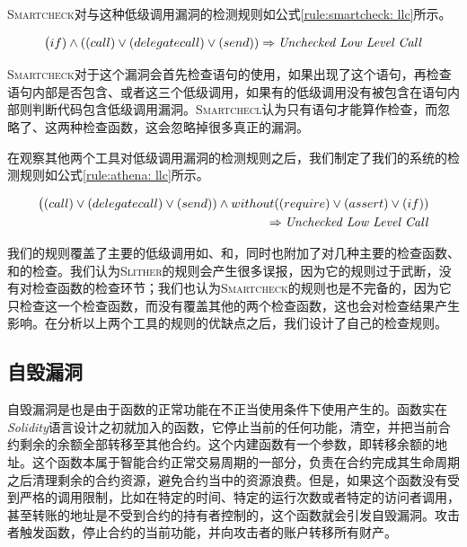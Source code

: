 \textsc{Smartcheck}对与这种低级调用漏洞的检测规则如公式\ref{rule:smartcheck: llc}所示。
\begin{mdframed}[
	linewidth = 1pt,
	innertopmargin = -5pt,
	innerbottommargin = 3pt,
	outerlinewidth = 1pt
	]
    \small
	\begin{equation} \label{rule:smartcheck: llc}
    \big (if) \wedge ((call) \vee (delegatecall) \vee (send)) \Rightarrow \text{\emph{Unchecked Low Level Call}}
	\end{equation}
\end{mdframed}
\textsc{Smartcheck}对于这个漏洞会首先检查语句的使用，如果出现了这个语句，再检查语句内部是否包含、或者这三个低级调用，如果有的低级调用没有被包含在语句内部则判断代码包含低级调用漏洞。\textsc{Smartchecl}认为只有语句才能算作检查，而忽略了、这两种检查函数，这会忽略掉很多真正的漏洞。

在观察其他两个工具对低级调用漏洞的检测规则之后，我们制定了我们的系统的检测规则如公式\ref{rule:athena: llc}所示。
\begin{mdframed}[
	linewidth = 1pt,
	innertopmargin = -5pt,
	innerbottommargin = 3pt,
	outerlinewidth = 1pt
	]
    \small
	\begin{equation} \label{rule:athena: llc}
    \begin{split}
       \big ((call) \vee (delegatecall) \vee (send)) \wedge without ((require) \vee (assert) \vee (if))  \\
        \Rightarrow \text{\emph{Unchecked Low Level Call}} 
    \end{split}
	\end{equation}
\end{mdframed}
我们的规则覆盖了主要的低级调用如、和，同时也附加了对几种主要的检查函数、和的检查。我们认为\textsc{Slither}的规则会产生很多误报，因为它的规则过于武断，没有对检查函数的检查环节；我们也认为\textsc{Smartcheck}的规则也是不完备的，因为它只检查这一个检查函数，而没有覆盖其他的两个检查函数，这也会对检查结果产生影响。在分析以上两个工具的规则的优缺点之后，我们设计了自己的检查规则。

\subsection{自毁漏洞}
自毁漏洞是也是由于函数的正常功能在不正当使用条件下使用产生的。函数实在\emph{Solidity}语言设计之初就加入的函数，它停止当前的任何功能，清空，并把当前合约剩余的余额全部转移至其他合约。这个内建函数有一个参数，即转移余额的地址。这个函数本属于智能合约正常交易周期的一部分，负责在合约完成其生命周期之后清理剩余的合约资源，避免合约当中的资源浪费。但是，如果这个函数没有受到严格的调用限制，比如在特定的时间、特定的运行次数或者特定的访问者调用，甚至转账的地址是不受到合约的持有者控制的，这个函数就会引发自毁漏洞。攻击者触发函数，停止合约的当前功能，并向攻击者的账户转移所有财产。

